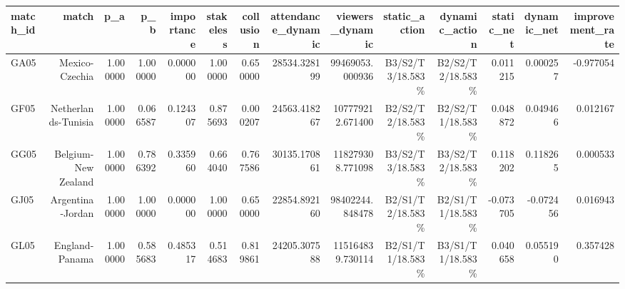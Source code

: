 \begin{tabular}{lrrrrrrrrrrrrr}
\toprule
match\_id & match & p\_a & p\_b & importance & stakeless & collusion & attendance\_dynamic & viewers\_dynamic & static\_action & dynamic\_action & static\_net & dynamic\_net & improvement\_rate \\
\midrule
GA05 & Mexico-Czechia & 1.000000 & 1.000000 & 0.000000 & 1.000000 & 0.650000 & 28534.328199 & 99469053.000936 & B3/S2/T3/18.583\% & B2/S2/T2/18.583\% & 0.011215 & 0.000257 & -0.977054 \\
GF05 & Netherlands-Tunisia & 1.000000 & 0.066587 & 0.124307 & 0.875693 & 0.000207 & 24563.418267 & 107779212.671400 & B2/S2/T2/18.583\% & B2/S2/T1/18.583\% & 0.048872 & 0.049466 & 0.012167 \\
GG05 & Belgium-New Zealand & 1.000000 & 0.786392 & 0.335960 & 0.664040 & 0.767586 & 30135.170861 & 118279308.771098 & B3/S2/T3/18.583\% & B3/S2/T2/18.583\% & 0.118202 & 0.118265 & 0.000533 \\
GJ05 & Argentina-Jordan & 1.000000 & 1.000000 & 0.000000 & 1.000000 & 0.650000 & 22854.892160 & 98402244.848478 & B2/S1/T2/18.583\% & B2/S1/T1/18.583\% & -0.073705 & -0.072456 & 0.016943 \\
GL05 & England-Panama & 1.000000 & 0.585683 & 0.485317 & 0.514683 & 0.819861 & 24205.307588 & 115164839.730114 & B2/S1/T1/18.583\% & B3/S1/T1/18.583\% & 0.040658 & 0.055190 & 0.357428 \\
\bottomrule
\end{tabular}
